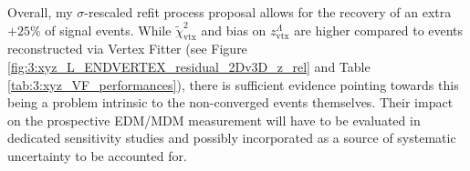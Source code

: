 Overall, my $\sigma$-rescaled refit process proposal allows for the recovery of an extra $+25\%$ of signal events.
While $\tilde{\chi}^2_\text{vtx}$ and bias on $z_\text{vtx}^\Lambda$ are higher compared to events reconstructed via Vertex Fitter (see Figure \ref{fig:3:xyz_L_ENDVERTEX_residual_2Dv3D_z_rel} and Table \ref{tab:3:xyz_VF_performances}), there is sufficient evidence pointing towards this being a problem intrinsic to the non-converged events themselves.
Their impact on the prospective \lz EDM/MDM measurement will have to be evaluated in dedicated sensitivity studies and possibly incorporated as a source of systematic uncertainty to be accounted for.

